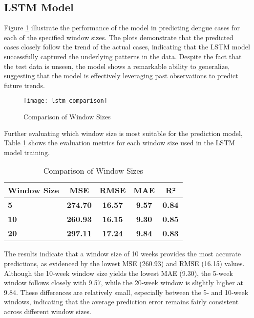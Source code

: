\subsection{LSTM Model}
Figure \ref{fig:lstm_comparison} illustrate the performance of the model in predicting dengue cases for each of the specified window sizes. The plots demonstrate that the predicted cases closely follow the trend of the actual cases, indicating that the LSTM model successfully captured the underlying patterns in the data. Despite the fact that the test data is unseen, the model shows a remarkable ability to generalize, suggesting that the model is effectively leveraging past observations to predict future trends.

\begin{figure}[H]
	\centering
	\texttt{[image: lstm\_comparison]}
	\caption{Comparison of Window Sizes}
	\label{fig:lstm_comparison}
\end{figure}

Further evaluating which window size is most suitable for the prediction model, Table \ref{tab:comparison_of_lstm} shows the evaluation metrics for each window size used in the LSTM model training.
\begin{table}[h!]
	\centering
	\begin{tabular}{|l|c|c|c|c|}
		\hline
		\textbf{Window Size} & \textbf{MSE} & \textbf{RMSE} & \textbf{MAE} & \textbf{R²}\\ \hline
		\textbf{5} & \textbf{274.70} & \textbf{16.57} & \textbf{9.57} & \textbf{0.84}\\ \hline
		\textbf{10} & \textbf{260.93} & \textbf{16.15} & \textbf{9.30} & \textbf{0.85}\\ \hline
		\textbf{20} & \textbf{297.11} & \textbf{17.24} & \textbf{9.84} & \textbf{0.83}\\ \hline
	\end{tabular}
	\caption{Comparison of Window Sizes}
	\label{tab:comparison_of_lstm}
\end{table}

The results indicate that a window size of 10 weeks provides the most accurate predictions, as evidenced by the lowest MSE (260.93) and RMSE (16.15) values. Although the 10-week window size yields the lowest MAE (9.30), the 5-week window follows closely with 9.57, while the 20-week window is slightly higher at 9.84. These differences are relatively small, especially between the 5- and 10-week windows, indicating that the average prediction error remains fairly consistent across different window sizes.

